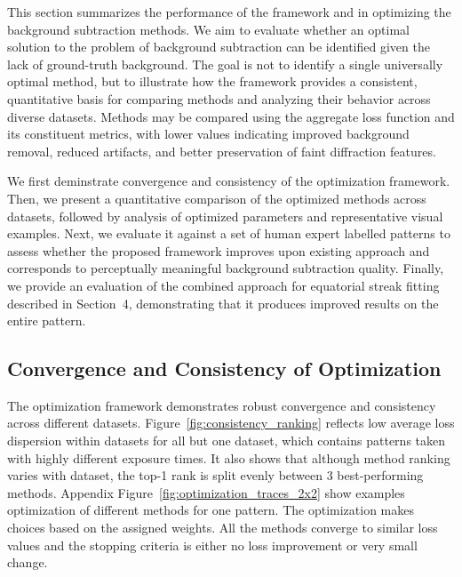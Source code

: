 \documentclass[iucr]{iucrjournals}
\begin{document}
This section summarizes the performance of the framework and in optimizing the background subtraction methods. We aim to evaluate whether an optimal solution to the problem of background subtraction can be identified given the lack of ground-truth background. The goal is not to identify a single universally optimal method, but to illustrate how the framework provides a consistent, quantitative basis for comparing methods and analyzing their behavior across diverse datasets. Methods may be compared using the aggregate loss function and its constituent metrics, with lower values indicating improved background removal, reduced artifacts, and better preservation of faint diffraction features.

We first deminstrate convergence and consistency of the optimization framework. Then, we present a quantitative comparison of the optimized methods across datasets, followed by analysis of optimized parameters and representative visual examples. Next, we evaluate it against a set of human expert labelled patterns to assess whether the proposed framework improves upon existing approach and corresponds to perceptually meaningful background subtraction quality. Finally, we provide an evaluation of the combined approach for equatorial streak fitting described in Section~4, demonstrating that it produces improved results on the entire pattern. 


\subsection{Convergence and Consistency of Optimization}

The optimization framework demonstrates robust convergence and consistency across different datasets. Figure~\ref{fig:consistency_ranking} reflects low average loss dispersion within datasets for all but one dataset, which contains patterns taken with highly different exposure times. It also shows that although method ranking varies with dataset, the top-1 rank is split evenly between 3 best-performing methods. Appendix Figure~\ref{fig:optimization_traces_2x2} show examples optimization of different methods for one pattern. The optimization makes choices based on the assigned weights. All the methods converge to similar loss values and the stopping criteria is either no loss improvement or very small change. 
\end{document}
